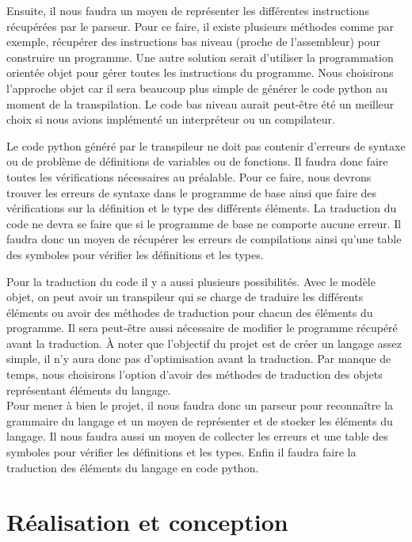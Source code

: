 \documentclass[a4paper]{article}%
\begin{document}
Ensuite, il nous faudra un moyen de représenter les différentes instructions
récupérées par le parseur. Pour ce faire, il existe plusieurs méthodes
comme par exemple, récupérer des instructions bas niveau (proche de
l'assembleur) pour construire un programme. Une autre solution serait d'utiliser
la programmation orientée objet pour gérer toutes les instructions du programme.
Nous choisirons l'approche objet car il sera beaucoup plus simple de générer le
code python au moment de la transpilation. Le code bas niveau aurait peut-être
été un meilleur choix si nous avions implémenté un interpréteur ou un
compilateur.

Le code python généré par le transpileur ne doit pas contenir d'erreurs de
syntaxe ou de problème de définitions de variables ou de fonctions. Il faudra
donc faire toutes les vérifications nécessaires au préalable. Pour ce faire,
nous devrons trouver les erreurs de syntaxe dans le programme de base ainsi que
faire des vérifications sur la définition et le type des différents éléments. La
traduction du code ne devra se faire que si le programme de base ne comporte
aucune erreur. Il faudra donc un moyen de récupérer les erreurs de compilations
ainsi qu'une table des symboles pour vérifier les définitions et les types.

Pour la traduction du code il y a aussi plusieurs possibilités. Avec le modèle
objet, on peut avoir un transpileur qui se charge de traduire les différents
éléments ou avoir des méthodes de traduction pour chacun des éléments du
programme. Il sera peut-être aussi nécessaire de modifier le programme récupéré
avant la traduction. À noter que l'objectif du projet est de créer un langage
assez simple, il n'y aura donc pas d'optimisation avant la traduction. Par
manque de temps, nous choisirons l'option d'avoir des méthodes de traduction des
objets représentant éléments du langage.\\

Pour mener à bien le projet, il nous faudra donc un parseur pour reconnaître la
grammaire du langage et un moyen de représenter et de stocker les éléments du
langage. Il nous faudra aussi un moyen de collecter les erreurs et une table des
symboles pour vérifier les définitions et les types. Enfin il faudra faire la
traduction des éléments du langage en code python.

\clearpage
\part{Réalisation et conception}
\end{document}

